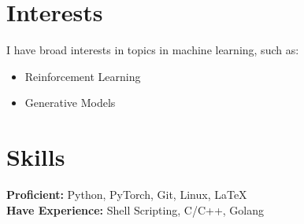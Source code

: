 \documentclass[11pt,a4paper]{article}
\begin{document}
\section*{Interests}
I have broad interests in topics in machine learning, such as:
\begin{itemize}[leftmargin=*, noitemsep, topsep=2pt]
    \item Reinforcement Learning
    \item Generative Models
\end{itemize}

\section*{Skills}
\textbf{Proficient:} Python, PyTorch, Git, Linux, LaTeX \\
\textbf{Have Experience:} Shell Scripting, C/C++, Golang
\end{document}
